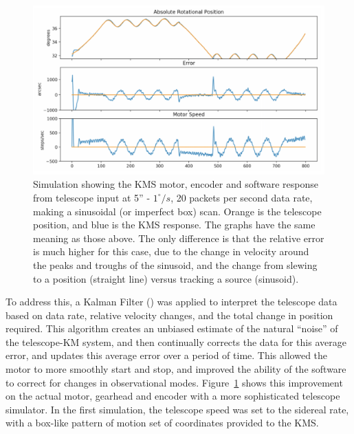 \documentclass[manuscript]{aastex}
\begin{document}
\newpage
\begin{figure}[H]
	\centering
	\captionsetup{width=\textwidth}
	\includegraphics[width=\textwidth]{km8.png}%
	\caption[Simulated KMS Performance, Realistic Box Scan]{Simulation showing the KMS motor, encoder and software response from telescope input at 5'' - $1^{\circ}/s$, 20 packets per second data rate, making a sinusoidal (or imperfect box) scan. Orange is the telescope position, and blue is the KMS response. The graphs have the same meaning as those above. The only difference is that the relative error is much higher for this case, due to the change in velocity around the peaks and troughs of the sinusoid, and the change from slewing to a position (straight line) versus tracking a source (sinusoid).}%
	\label{fig:km8}%
\end{figure}

To address this, a Kalman Filter (\cite{Chung-Ming2004}) was applied to interpret the telescope data based on data rate, relative velocity changes, and the total change in position required. This algorithm creates an unbiased estimate of the natural ``noise'' of the telescope-KM system, and then continually corrects the data for this average error, and updates this average error over a period of time. This allowed the motor to more smoothly start and stop, and improved the ability of the software to correct for changes in observational modes. Figure~\ref{fig:km8} shows this improvement on the actual motor, gearhead and encoder with a more sophisticated telescope simulator. In the first simulation, the telescope speed was set to the sidereal rate, with a box-like pattern of motion set of coordinates provided to the KMS. 
\end{document}
